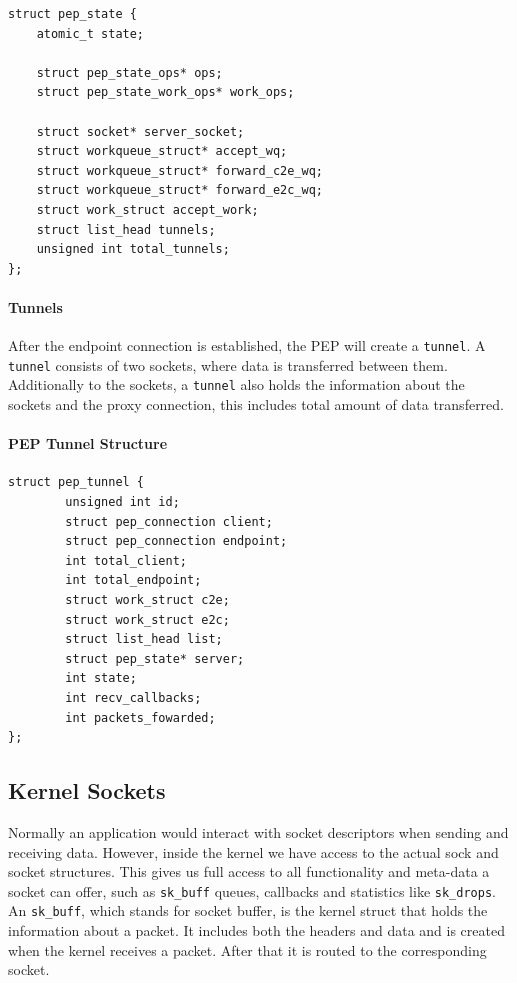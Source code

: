 \documentclass[a4paper,english, 11pt]{report}
\begin{document}
\noindent\begin{minipage}{\linewidth}
\begin{verbatim}
struct pep_state {
    atomic_t state;
    
    struct pep_state_ops* ops;
    struct pep_state_work_ops* work_ops;
    
    struct socket* server_socket;
    struct workqueue_struct* accept_wq;
    struct workqueue_struct* forward_c2e_wq;
    struct workqueue_struct* forward_e2c_wq;
    struct work_struct accept_work;
    struct list_head tunnels;
    unsigned int total_tunnels;
};
\end{verbatim}
\label{fig:pep_state_structure}
\end{minipage}

\paragraph{Tunnels}
After the endpoint connection is established, the PEP will create a \verb|tunnel|. A \verb|tunnel| consists of two sockets, where data is transferred between them. Additionally to the sockets, a \verb|tunnel| also holds the information about the sockets and the proxy connection, this includes total amount of data transferred.\\

\noindent\begin{minipage}{\linewidth}
\paragraph{PEP Tunnel Structure}
\begin{verbatim}
struct pep_tunnel {
        unsigned int id;
        struct pep_connection client;
        struct pep_connection endpoint;
        int total_client;
        int total_endpoint;
        struct work_struct c2e;
        struct work_struct e2c;
        struct list_head list;
        struct pep_state* server;
        int state;
        int recv_callbacks;
        int packets_fowarded;
};
\end{verbatim}
\end{minipage}

\subsection{Kernel Sockets}
Normally an application would interact with socket descriptors when sending and receiving data. However, inside the kernel we have access to the actual sock and socket structures. This gives us full access to all functionality and meta-data a socket can offer, such as \verb|sk_buff| queues, callbacks and statistics like \verb|sk_drops|. An \verb|sk_buff|, which stands for socket buffer, is the kernel struct that holds the information about a packet. It includes both the headers and data and is created when the kernel receives a packet. After that it is routed to the corresponding socket.\\
\end{document}
